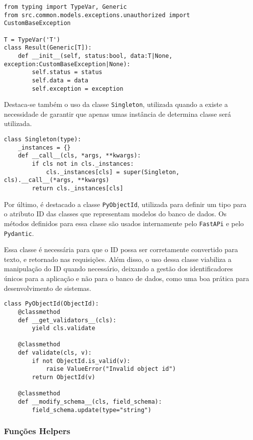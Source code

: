 \begin{verbatim}
from typing import TypeVar, Generic
from src.common.models.exceptions.unauthorized import CustomBaseException

T = TypeVar('T')
class Result(Generic[T]):
    def __init__(self, status:bool, data:T|None, exception:CustomBaseException|None):
        self.status = status
        self.data = data
        self.exception = exception
\end{verbatim}

Destaca-se também o uso da classe \texttt{Singleton}, utilizada quando a existe a necessidade de garantir que apenas umas instância de determina classe será utilizada.

\begin{verbatim}
class Singleton(type):
    _instances = {}
    def __call__(cls, *args, **kwargs):
        if cls not in cls._instances:
            cls._instances[cls] = super(Singleton, cls).__call__(*args, **kwargs)
        return cls._instances[cls]
\end{verbatim}

Por último, é destacado a classe \texttt{PyObjectId}, utilizada para definir um tipo para o atributo ID das classes que representam modelos do banco de dados. Os métodos definidos para essa classe são usados internamente pelo \texttt{FastAPi} e pelo \texttt{Pydantic}.

Essa classe é necessária para que o ID possa ser corretamente convertido para texto, e retornado nas requisições. Além disso, o uso dessa classe viabiliza a manipulação do ID quando necessário, deixando a gestão dos identificadores únicos para a aplicação e não para o banco de dados, como uma boa prática para desenvolvimento de sistemas.

\begin{verbatim}
class PyObjectId(ObjectId):
    @classmethod
    def __get_validators__(cls):
        yield cls.validate

    @classmethod
    def validate(cls, v):
        if not ObjectId.is_valid(v):
            raise ValueError("Invalid object id")
        return ObjectId(v)

    @classmethod
    def __modify_schema__(cls, field_schema):
        field_schema.update(type="string")
\end{verbatim}

\subsubsection{Funções Helpers}

